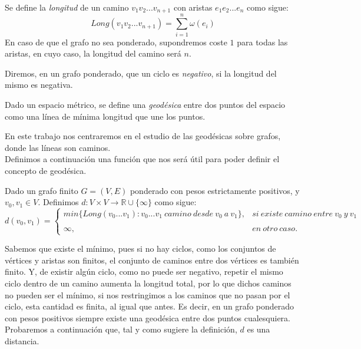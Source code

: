 \begin{definicion}
	Se define la \textit{longitud} de un camino $v_1v_2...v_{n+1}$ con aristas $e_1e_2...e_n$ como sigue: 
	$$Long(v_1v_2...v_{n+1}) = \sum_{i=1}^{n}\omega(e_i)$$
	En caso de que el grafo no sea ponderado, supondremos coste $1$ para todas las aristas, en cuyo caso, la longitud del camino será $n$.
\end{definicion}

Diremos, en un grafo ponderado, que un ciclo es \textit{negativo}, si la longitud del mismo es negativa.

\begin{definicion}
	Dado un espacio métrico, se define una \textit{geodésica} entre dos puntos del espacio como una línea de mínima longitud que une los puntos.
\end{definicion}

En este trabajo nos centraremos en el estudio de las geodésicas sobre grafos, donde las líneas son caminos. \\

Definimos a continuación una función que nos será útil para poder definir el concepto de geodésica.

\begin{definicion}\label{def:dist}
	Dado un grafo finito $G=(V,E)$ ponderado con pesos estrictamente positivos,  y $v_0,v_1\in V$. Definimos $d:V\times V \rightarrow \mathbb{R}\cup \{\infty\}$ como sigue:
	$$d(v_0,v_1)= \left\{ \begin{array}{lcc}
		min\{Long(v_0...v_1) : v_0...v_1\ camino\ desde\ v_0\ a\ v_1\}, &   si\ existe\ camino\ entre\ v_0\ y\ v_1 \\
		\\ \infty, &  en\ otro\ caso.
	\end{array}
	\right.$$
\end{definicion}

Sabemos que existe el mínimo, pues si no hay ciclos, como los conjuntos de vértices y aristas son finitos, el conjunto de caminos entre dos vértices es también finito. Y, de existir algún ciclo, como no puede ser negativo, repetir el mismo ciclo dentro de un camino aumenta la longitud total, por lo que dichos caminos no pueden ser el mínimo, si nos restringimos a los caminos que no pasan por el ciclo, esta cantidad es finita, al igual que antes. Es decir, en un grafo ponderado con pesos positivos siempre existe una geodésica entre dos puntos cualesquiera. \\

Probaremos a continuación que, tal y como sugiere la definición, $d$ es una distancia.

